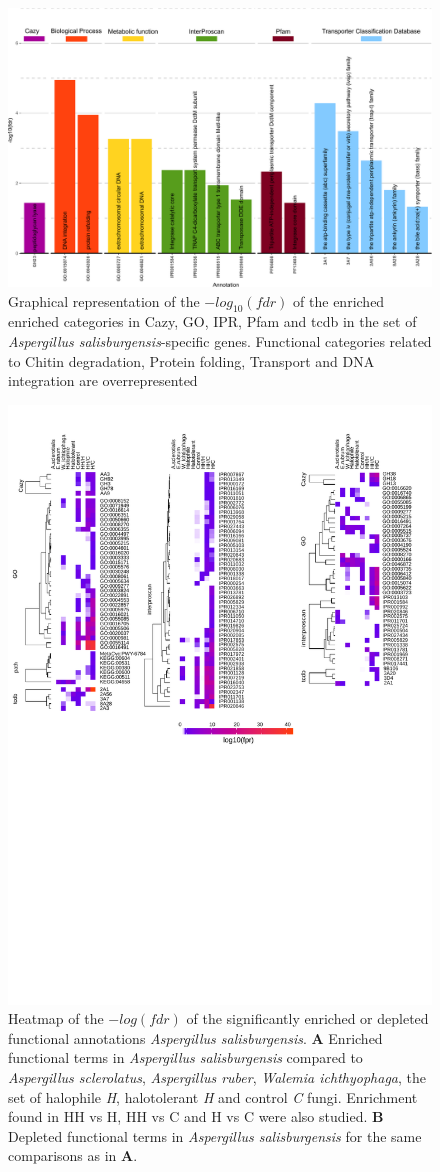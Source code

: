 \documentclass[jof,article,submit,moreauthors,pdftex,10pt,a4paper]{Definitions/mdpi}
\newcommand{\aspRub}{\textit{Aspergillus ruber}}
\newcommand{\walIch}{\textit{Walemia ichthyophaga}}
\newcommand{\phiSp}{\textit{Aspergillus salisburgensis}}
\newcommand{\phiScl}{\textit{Aspergillus sclerolatus}}
\begin{document}
\begin{figure}
    \centering
    \includegraphics[width=0.9\linewidth]{toPlot_specificToPhiSp.pdf}
    \caption{Graphical representation of the $-log_10(fdr)$ of the enriched enriched categories in Cazy, GO, IPR, Pfam and tcdb in the set of {\phiSp}-specific genes. Functional categories related to Chitin degradation, Protein folding, Transport and DNA integration are overrepresented}
    \label{fig:spec}
\end{figure}

\begin{figure}
    \centering
    \includegraphics[width=0.8\linewidth]{over_under_final.pdf}
    \caption{\label{fig:ovun} Heatmap of the $-log(fdr)$ of the significantly enriched or depleted functional annotations {\phiSp}. 
    \textbf{A} Enriched functional terms in {\phiSp} compared to {\phiScl}, {\aspRub}, {\walIch}, the set of halophile \textit{H}, halotolerant \textit{H} and control \textit{C} fungi. Enrichment found in HH vs H, HH vs C and H vs C were also studied. \textbf{B} Depleted functional terms in {\phiSp} for the same comparisons as in \textbf{A}.}
\end{figure}
\end{document}
